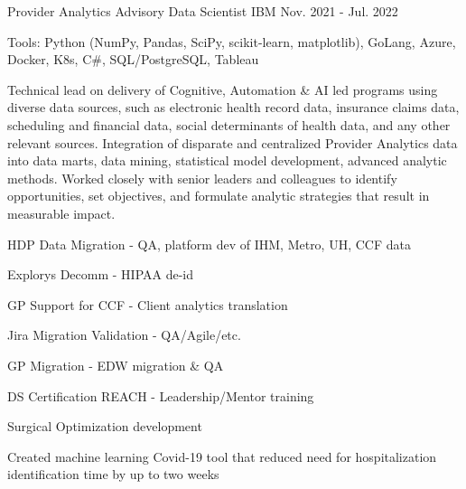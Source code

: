 \begin{cventries}
  \cvexpentry
    {Provider Analytics} %
    {Advisory Data Scientist} %
    {IBM}
    {Nov. 2021 - Jul. 2022}
    {
      \begin{cvheavyparagraph}
        Tools: Python (NumPy, Pandas, SciPy, scikit-learn, matplotlib), GoLang, Azure, Docker, K8s, C\#, SQL/PostgreSQL, Tableau
      \end{cvheavyparagraph}
    }
    {
      \begin{cvparagraph}
        Technical lead on delivery of Cognitive, Automation \& AI led programs using diverse data sources, such as electronic health record data, insurance claims data, scheduling and financial data, social determinants of health data, and any other relevant sources.  Integration of disparate and centralized Provider Analytics data into data marts, data mining, statistical model development, advanced analytic methods.  Worked closely with senior leaders and colleagues to identify opportunities, set objectives, and formulate analytic strategies that result in measurable impact.
      \end{cvparagraph}
      \begin{cvitems}
        \item {HDP Data Migration - QA, platform dev of IHM, Metro, UH, CCF data}
        \item {Explorys Decomm - HIPAA de-id}
        \item {GP Support for CCF - Client analytics translation}
        \item {Jira Migration Validation - QA/Agile/etc.}
        \item {GP Migration - EDW migration \& QA}
        \item {DS Certification REACH - Leadership/Mentor training}
        \item {Surgical Optimization development}
        \item {Created machine learning Covid-19 tool that reduced need for hospitalization identification time by up to two weeks}
      \end{cvitems}
    }


\end{cventries}
